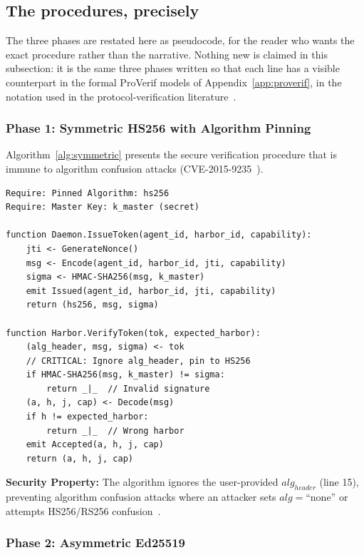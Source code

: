 \documentclass[11pt,a4paper]{article}
\theoremstyle{definition}
\begin{document}
\subsection{The procedures, precisely}\label{sec:algorithms}

The three phases are restated here as pseudocode, for the reader who wants the exact procedure rather than the narrative. Nothing new is claimed in this subsection: it is the same three phases written so that each line has a visible counterpart in the formal ProVerif models of Appendix~\ref{app:proverif}, in the notation used in the protocol-verification literature~\cite{blanchet2016modeling,lowe1997hierarchy}.

\subsubsection{Phase 1: Symmetric HS256 with Algorithm Pinning}

Algorithm~\ref{alg:symmetric} presents the secure verification procedure that is immune to algorithm confusion attacks (CVE-2015-9235~\cite{cve20159235}).

\begin{lstlisting}[caption={Algorithm 1: Secure Harbor Verification (HS256 with Algorithm Pinning)},label={alg:symmetric}]
Require: Pinned Algorithm: hs256
Require: Master Key: k_master (secret)

function Daemon.IssueToken(agent_id, harbor_id, capability):
    jti <- GenerateNonce()
    msg <- Encode(agent_id, harbor_id, jti, capability)
    sigma <- HMAC-SHA256(msg, k_master)
    emit Issued(agent_id, harbor_id, jti, capability)
    return (hs256, msg, sigma)

function Harbor.VerifyToken(tok, expected_harbor):
    (alg_header, msg, sigma) <- tok
    // CRITICAL: Ignore alg_header, pin to HS256
    if HMAC-SHA256(msg, k_master) != sigma:
        return _|_  // Invalid signature
    (a, h, j, cap) <- Decode(msg)
    if h != expected_harbor:
        return _|_  // Wrong harbor
    emit Accepted(a, h, j, cap)
    return (a, h, j, cap)
\end{lstlisting}

\textbf{Security Property:} The algorithm ignores the user-provided $alg_{header}$ (line 15), preventing algorithm confusion attacks where an attacker sets $alg = \text{``none''}$ or attempts HS256/RS256 confusion~\cite{mclean2015critical}.

\subsubsection{Phase 2: Asymmetric Ed25519}
\end{document}
